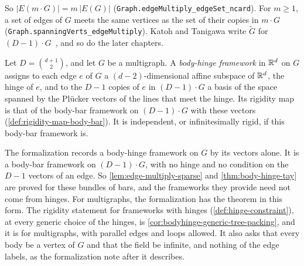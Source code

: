 So $|E(m \cdot G)| = m\, |E(G)|$
(\texttt{Graph.\allowbreak{}edgeMultiply\_\allowbreak{}edgeSet\_\allowbreak{}ncard}).
For $m \ge 1$, a set of edges of $G$ meets the same vertices as the set
of their copies in $m \cdot G$
(\texttt{Graph.\allowbreak{}spanningVerts\_\allowbreak{}edgeMultiply}).
Katoh and Tanigawa write $\tilde G$ for
$(D-1)\cdot G$~\cite[\S1]{katohTanigawa2011}, and so do the later
chapters.

\begin{definition}
  \label{def:body-hinge-framework}
  \leanok
  Let $D = \binom{d+1}{2}$, and let $G$ be a multigraph. A
  \emph{body-hinge framework} in ${\mathbb{R}}^d$ on $G$ assigns to each edge $e$
  of $G$ a $(d-2)$-dimensional affine subspace of ${\mathbb{R}}^d$, the hinge of
  $e$, and to the $D - 1$ copies of $e$ in $(D-1)\cdot G$ a basis of the
  space spanned by the Pl\"ucker vectors of the lines that meet the
  hinge. Its rigidity map is that of the body-bar framework on
  $(D-1)\cdot G$ with these vectors (\cref{def:rigidity-map-body-bar}).
  It is independent, or infinitesimally rigid, if this body-bar
  framework is.
\end{definition}
\begin{fmlnote}
  The formalization records a body-hinge framework on $G$ by its
  vectors alone. It is a body-bar framework on $(D-1)\cdot G$, with no
  hinge and no condition on the $D - 1$ vectors of an edge. So
  \cref{lem:edge-multiply-sparse} and \cref{thm:body-hinge-tay} are
  proved for these bundles of bars, and the frameworks they provide
  need not come from hinges. For multigraphs, the formalization has
  the theorem in this form. The rigidity statement for frameworks with
  hinges (\cref{def:hinge-constraint}), at every generic choice of the
  hinges, is \cref{cor:bodyhinge-generic-tree-packing}, and it is for
  multigraphs, with parallel edges and loops allowed. It also asks that every body be a vertex of $G$
  and that the field be infinite, and nothing of the edge labels, as
  the formalization note after it describes.
\end{fmlnote}

